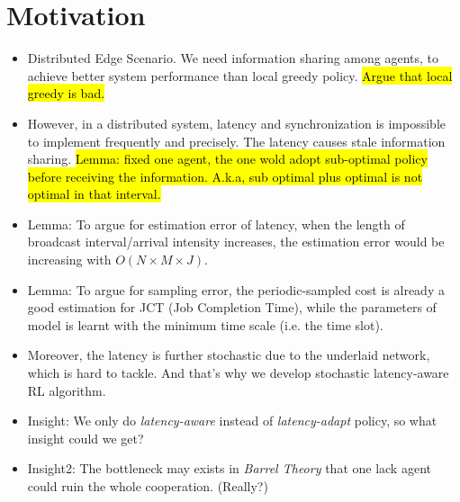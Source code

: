 \section{Motivation}
\begin{itemize}
    \item Distributed Edge Scenario. We need information sharing among agents, to achieve better system performance than local greedy policy. \hl{Argue that local greedy is bad.}
    \item However, in a distributed system, latency and synchronization is impossible to implement frequently and precisely. The latency causes stale information sharing. \hl{Lemma: fixed one agent, the one wold adopt sub-optimal policy before receiving the information. A.k.a, sub optimal plus optimal is not optimal in that interval.}
    \item Lemma: To argue for estimation error of latency, when the length of broadcast interval/arrival intensity increases, the estimation error would be increasing with $O(N \times M \times J)$.
    \item Lemma: To argue for sampling error, the periodic-sampled cost is already a good estimation for JCT (Job Completion Time), while the parameters of model is learnt with the minimum time scale (i.e. the time slot).
    \item Moreover, the latency is further stochastic due to the underlaid network, which is hard to tackle. And that's why we develop stochastic latency-aware RL algorithm.
    \item Insight: We only do \emph{latency-aware} instead of \emph{latency-adapt} policy, so what insight could we get?
    \item Insight2: The bottleneck may exists in \emph{Barrel Theory} that one lack agent could ruin the whole cooperation. (Really?)
\end{itemize}